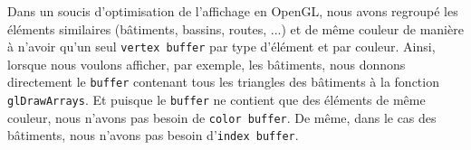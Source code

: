 Dans un soucis d'optimisation de l'affichage en OpenGL, nous avons regroupé les éléments similaires (bâtiments, bassins, routes, ...) et de même couleur de manière à n'avoir qu'un seul \texttt{vertex buffer} par type d'élément et par couleur. Ainsi, lorsque nous voulons afficher, par exemple, les bâtiments, nous donnons directement le \texttt{buffer} contenant tous les triangles des bâtiments à la fonction \texttt{glDrawArrays}. Et puisque le \texttt{buffer} ne contient que des éléments de même couleur, nous n'avons pas besoin de \texttt{color buffer}. De même, dans le cas des bâtiments, nous n'avons pas besoin d'\texttt{index buffer}.